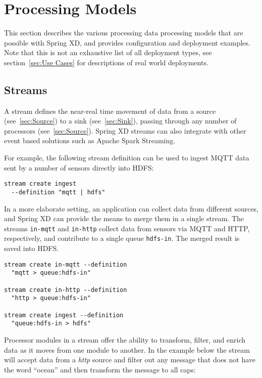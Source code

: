 \section{Processing Models}
This section describes the various processing data processing models that are possible with
Spring XD, and provides configuration and deployment examples.
Note that this is not an exhaustive list of all
deployment types, see section~\ref{sec:Use Cases} for descriptions of real
world deployments.

\subsection {Streams}

A stream defines the near-real time movement of data from a source (see~\ref{sec:Source}) to a
sink (see~\ref{sec:Sink}), passing through any number of processors (see~\ref{sec:Source}).  Spring XD streams can
also integrate with other event based solutions such as Apache Spark Streaming.

For example, the following stream definition can be used to ingest
MQTT\cite{mqtt} data sent by a number of sensors directly into HDFS:

\begin{lstlisting}
stream create ingest
  --definition "mqtt | hdfs"
\end{lstlisting}

In a more elaborate setting, an application can collect data from
different sources, and Spring XD can provide the means to merge them
in a single stream. The streams \texttt{in-mqtt} and \texttt{in-http}
collect data from sensors via MQTT and HTTP, respectively, and
contribute to a single queue \texttt{hdfs-in}. The merged result
is saved into HDFS.

\begin{lstlisting}
stream create in-mqtt --definition
  "mqtt > queue:hdfs-in"

stream create in-http --definition
  "http > queue:hdfs-in"

stream create ingest --definition
  "queue:hdfs-in > hdfs"
\end{lstlisting}

Processor modules in a stream offer the ability to transform, filter,
and enrich data as it moves from one module to another.  In the example below
the stream will accept data from a \emph{http} source and filter out any message
that does not have the word ``ocean'' and then transform the message
to all caps:

